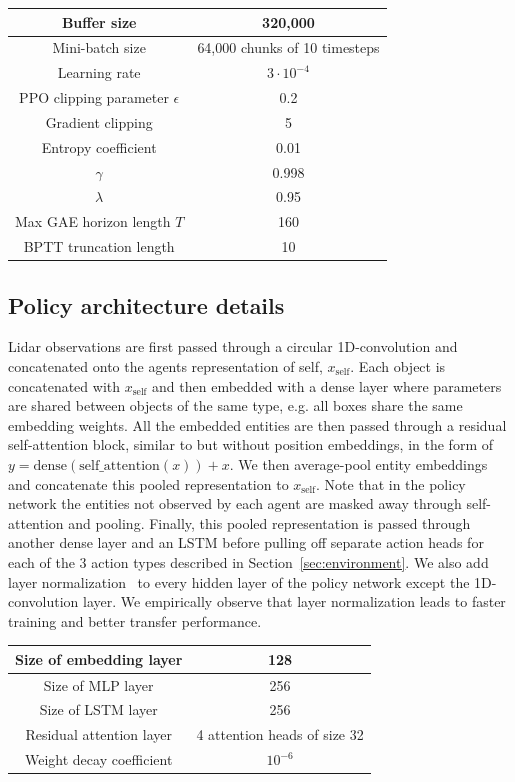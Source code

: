 \begin{center}
\begin{tabular}[h]{|c|c|}
    \hline
	Buffer size & 320,000 \\
	\hline
	Mini-batch size & 64,000 chunks of 10 timesteps\\
	\hline
	Learning rate & $3 \cdot 10^{-4}$ \\
	\hline
	PPO clipping parameter $\epsilon$ & 0.2 \\
	\hline
	Gradient clipping & 5 \\
	\hline
	Entropy coefficient &  0.01 \\
	\hline
	$\gamma$ & 0.998  \\
	\hline
	$\lambda$ & 0.95 \\
	\hline
	Max GAE horizon length $T$ & 160 \\
	\hline
	BPTT truncation length & 10 \\
	\hline
\end{tabular}
\end{center}

\subsection{Policy architecture details}

Lidar observations are first passed through a circular 1D-convolution and concatenated onto the agents representation of self, $x_\text{self}$. Each object is concatenated with $x_\text{self}$ and then embedded with a dense layer where parameters are shared between objects of the same type, e.g. all boxes share the same embedding weights.
All the embedded entities are then passed through a residual self-attention block, similar to \cite{vaswani2017attention} but without position embeddings, in the form of $y = \text{dense}(\text{self\_attention}(x)) + x$.
We then average-pool entity embeddings and concatenate this pooled representation to $x_\text{self}$. Note that in the policy network the entities not observed by each agent are masked away through self-attention and pooling. Finally, this pooled representation is passed through another dense layer and an LSTM \citep{hochreiter1997long} before pulling off separate action heads for each of the 3 action types described in Section~\ref{sec:environment}. 
We also add layer normalization~\citep{ba2016layer} to every hidden layer of the policy network except the 1D-convolution layer. We empirically observe that layer normalization leads to faster training and better transfer performance.

\begin{center}
\begin{tabular}[h]{|c|c|}
    \hline
	Size of embedding layer & 128 \\
	\hline
	Size of MLP layer& 256 \\
	\hline
	Size of LSTM layer & 256 \\
	\hline
	Residual attention layer & 4 attention heads of size 32 \\
	\hline
	Weight decay coefficient & $10^{-6}$ \\
	\hline
\end{tabular}
\end{center}

